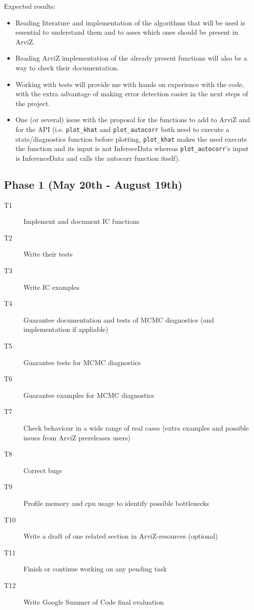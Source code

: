 \documentclass{article}
\begin{document}
\noindent Expected results:

\begin{itemize}
\item
  Reading literature and implementation of the algorithms that will be
  used is essential to understand them and to asses which ones should be
  present in ArviZ.
\item
  Reading ArviZ implementation of the already present functions will
  also be a way to check their documentation.
\item
  Working with tests will provide me with hands on experience with the
  code, with the extra advantage of making error detection easier in the
  next steps of the project.
\item
  One (or several) issue with the proposal for the functions to add to
  ArviZ and for the API (i.e. \texttt{plot\_khat} and
  \texttt{plot\_autocorr} both need to execute a stats/diagnostics
  function before plotting, \texttt{plot\_khat} makes the used execute
  the function and its input is not InfereceData whereas
  \texttt{plot\_autocorr}'s input is InferenceData and calls the
  autocorr function itself).
\end{itemize}

\subsection{\texorpdfstring{\textbf{Phase 1} (May 20th - August
19th)}{Phase 1 (May 20th - August 19th)}}\label{phase-1-may-20th---august-19th}

\begin{description}
\item[T1] Implement and document IC functions
\item[T2] Write their tests
\item[T3] Write IC examples
\item[T4] Guarantee documentation and tests of MCMC diagnostics (and
  implementation if appliable)
\item[T5] Guarantee tests for MCMC diagnostics
\item[T6] Guarantee examples for MCMC diagnostics
\item[T7] Check behaviour in a wide range of real cases (extra examples and
  possible issues from ArviZ prereleases users)
\item[T8] Correct bugs
\item[T9] Profile memory and cpu usage to identify possible bottlenecks
\item[T10] Write a draft of one related section in ArviZ-resources
  (optional)
\item[T11] Finish or continue working on any pending task
\item[T12] Write Google Summer of Code final evaluation
\end{description}
\end{document}
